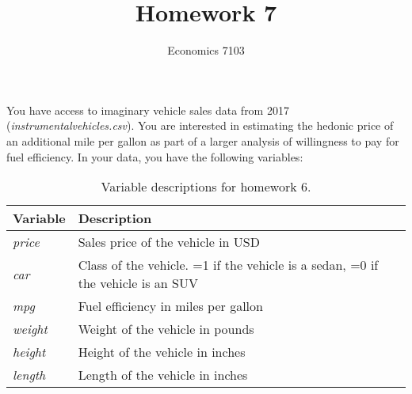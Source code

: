 \documentclass{article}
\title{Homework 7}
\author{Economics 7103}
\date{ }
\begin{document}
\maketitle

\noindent You have access to imaginary vehicle sales data from 2017 (\textit{instrumentalvehicles.csv}).  You are interested in estimating the hedonic price of an additional mile per gallon as part of a larger analysis of willingness to pay for fuel efficiency.  In your data, you have the following variables:
\begin{table}[h]
    \centering
    \begin{tabular}{l|l}
        Variable & Description \\ \hline
         \textit{price} & Sales price of the vehicle in USD  \\
         \textit{car} & Class of the vehicle. =1 if the vehicle is a sedan, =0 if the vehicle is an SUV \\
         \textit{mpg} & Fuel efficiency in miles per gallon \\
         \textit{weight} & Weight of the vehicle in pounds \\
         \textit{height} & Height of the vehicle in inches \\
         \textit{length} & Length of the vehicle in inches \\
    \end{tabular}
    \caption{Variable descriptions for homework 6.}
    \label{tab:variables6}
\end{table}
\end{document}
